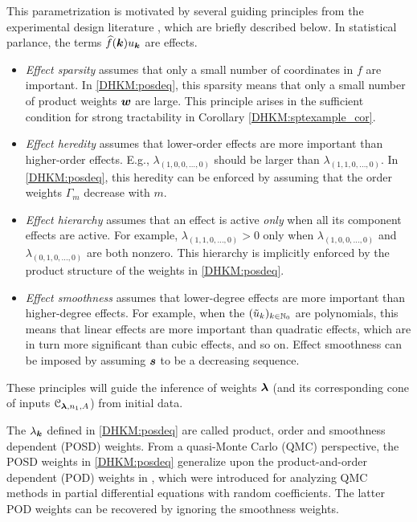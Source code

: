 \documentclass[USenglish]{article}
\theoremstyle{dgthm}
\theoremstyle{dgthm}
\theoremstyle{dgthm}
\theoremstyle{dgthm}
\theoremstyle{dgdef}
\theoremstyle{definition}
\newcommand{\hf}{\widehat{f}}
\newcommand{\tu}{\Tilde{u}}
\begin{document}
This parametrization is motivated by several guiding principles from the experimental design literature \citep{WuHam2009}, which are briefly described below.  In statistical parlance, the terms $\hf(\bsk) u_{\bsk}$ are effects.
\begin{itemize}
\item \emph{Effect sparsity} assumes that only a small number of coordinates in $f$ are important. In \eqref{DHKM:posdeq}, this sparsity means that only a small number of product weights ${\boldsymbol{w}}$ are large.  This principle arises in the sufficient condition for strong tractability in Corollary \ref{DHKM:sptexample_cor}.
\item \emph{Effect heredity} assumes that lower-order effects are more important than higher-order effects. E.g., $\lambda_{(1,0, 0,\ldots, 0)}$ should be larger than $\lambda_{(1, 1, 0, \ldots, 0)}$. In \eqref{DHKM:posdeq}, this heredity can be enforced by assuming that the order weights $\Gamma_{m}$ decrease with $m$. 
\item \emph{Effect hierarchy} assumes that an effect is active \emph{only} when all its component effects are active. For example, $\lambda_{(1, 1, 0, \ldots, 0)} > 0$ only when $\lambda_{(1, 0, 0, \ldots, 0)}$ and $\lambda_{(0, 1, 0, \ldots, 0)}$ are both nonzero. This hierarchy is implicitly enforced by the product structure of the weights in \eqref{DHKM:posdeq}.
\item \emph{Effect smoothness} assumes that lower-degree effects are more important than higher-degree effects. For example, when the $(\tu_k)_{k \in \mathbb{N}_0}$ are polynomials, this means that linear effects are more important than quadratic effects, which are in turn more significant than cubic effects, and so on. Effect smoothness can be imposed by assuming ${\boldsymbol{s}}$ to be a decreasing sequence. 
\end{itemize} 
\vspace{-3ex}
These principles will guide the inference of weights ${\boldsymbol{\lambda}}$ (and its corresponding cone of inputs ${\mathcal{C}}_{{\boldsymbol{\lambda}},n_1,A}$) from initial data.

\hspace{\parindent} The $\lambda_{{\boldsymbol{k}}}$ defined in \eqref{DHKM:posdeq} are called product, order and smoothness dependent (POSD) weights.  From a quasi-Monte Carlo (QMC) perspective, the POSD weights in \eqref{DHKM:posdeq} generalize upon the product-and-order dependent (POD) weights in \cite{KuoEtal12a}, which were introduced for analyzing QMC methods in partial differential equations with random coefficients. The latter POD weights can be recovered by ignoring the smoothness weights. 
\end{document}
